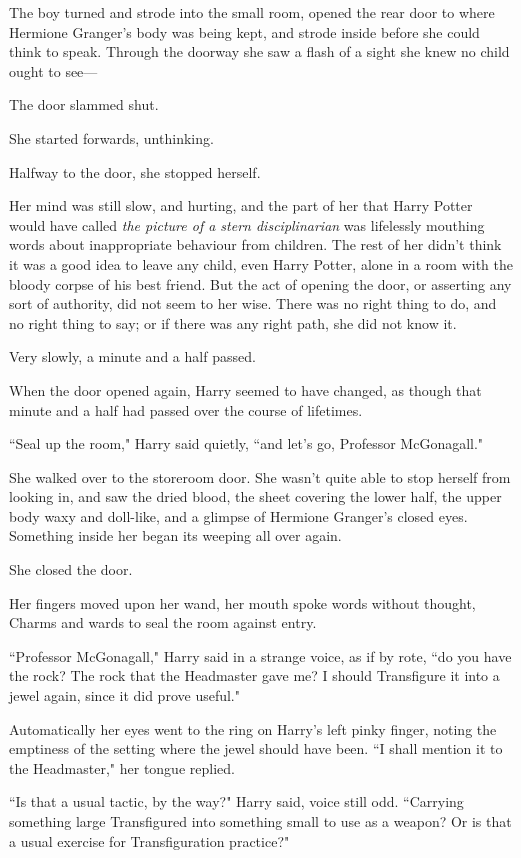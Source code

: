 The boy turned and strode into the small room, opened the rear door to where Hermione Granger's body was being kept, and strode inside before she could think to speak. Through the doorway she saw a flash of a sight she knew no child ought to see—

The door slammed shut.

She started forwards, unthinking.

Halfway to the door, she stopped herself.

Her mind was still slow, and hurting, and the part of her that Harry Potter would have called \emph{the picture of a stern disciplinarian} was lifelessly mouthing words about inappropriate behaviour from children. The rest of her didn't think it was a good idea to leave any child, even Harry Potter, alone in a room with the bloody corpse of his best friend. But the act of opening the door, or asserting any sort of authority, did not seem to her wise. There was no right thing to do, and no right thing to say; or if there was any right path, she did not know it.

Very slowly, a minute and a half passed.

\later

When the door opened again, Harry seemed to have changed, as though that minute and a half had passed over the course of lifetimes.

``Seal up the room," Harry said quietly, ``and let's go, Professor McGonagall."

She walked over to the storeroom door. She wasn't quite able to stop herself from looking in, and saw the dried blood, the sheet covering the lower half, the upper body waxy and doll-like, and a glimpse of Hermione Granger's closed eyes. Something inside her began its weeping all over again.

She closed the door.

Her fingers moved upon her wand, her mouth spoke words without thought, Charms and wards to seal the room against entry.

``Professor McGonagall," Harry said in a strange voice, as if by rote, ``do you have the rock? The rock that the Headmaster gave me? I should Transfigure it into a jewel again, since it did prove useful."

Automatically her eyes went to the ring on Harry's left pinky finger, noting the emptiness of the setting where the jewel should have been. ``I shall mention it to the Headmaster," her tongue replied.

``Is that a usual tactic, by the way?" Harry said, voice still odd. ``Carrying something large Transfigured into something small to use as a weapon? Or is that a usual exercise for Transfiguration practice?"

